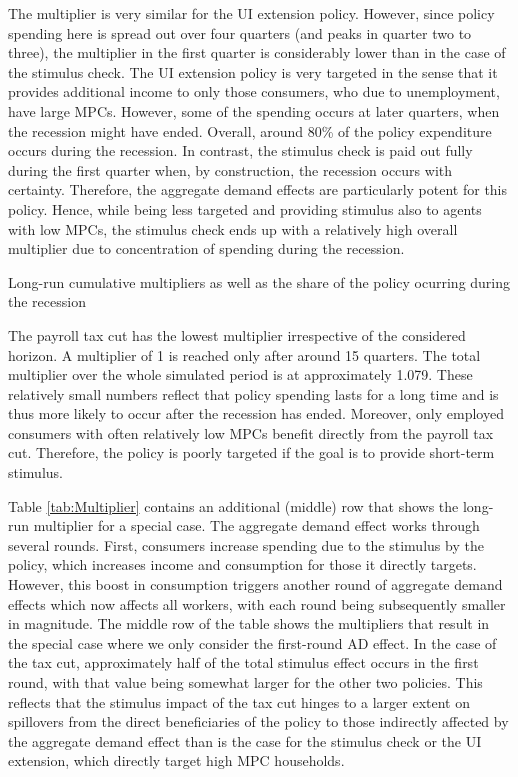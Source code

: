 \documentclass[../HAFiscal]{subfiles}
\begin{document}
The multiplier is very similar for the UI extension policy. However, since policy spending here is spread out over four quarters (and peaks in quarter two to three), the multiplier in the first quarter is considerably lower than in the case of the stimulus check. The UI extension policy is very targeted in the sense that it provides additional income to only those consumers, who due to unemployment, have large MPCs. However, some of the spending occurs at later quarters, when the recession might have ended. Overall, around 80\% of the policy expenditure occurs during the recession. In contrast, the stimulus check is paid out fully during the first quarter when, by construction, the recession occurs with certainty. Therefore, the aggregate demand effects are particularly potent for this policy. Hence, while being less targeted and providing stimulus also to agents with low MPCs, the stimulus check ends up with a relatively high overall multiplier due to concentration of spending during the recession.

\begin{table}[t]
	\center
	
	\caption{Long-run cumulative multipliers as well as the share of the policy ocurring during the recession}
	\label{tab:Multiplier}
\end{table}

The payroll tax cut has the lowest multiplier irrespective of the considered horizon. A multiplier of 1 is reached only after around 15 quarters. The total multiplier over the whole simulated period is at approximately 1.079. These relatively small numbers reflect that policy spending lasts for a long time and is thus more likely to occur after the recession has ended. Moreover, only employed consumers with often relatively low MPCs benefit directly from the payroll tax cut. Therefore, the policy is poorly targeted if the goal is to provide short-term stimulus. 

Table \ref{tab:Multiplier} contains an additional (middle) row that shows the long-run multiplier for a special case. The aggregate demand effect works through several rounds. First, consumers increase spending due to the stimulus by the policy, which increases income and consumption for those it directly targets. However, this boost in consumption triggers another round of aggregate demand effects which now affects all workers, with each round being subsequently smaller in magnitude. The middle row of the table shows the multipliers that result in the special case where we only consider the first-round AD effect. In the case of the tax cut, approximately half of the total stimulus effect occurs in the first round, with that value being somewhat larger for the other two policies. This reflects that the stimulus impact of the tax cut hinges to a larger extent on spillovers from the direct beneficiaries of the policy to those indirectly affected by the aggregate demand effect than is the case for the stimulus check or the UI extension, which directly target high MPC households.
\end{document}
